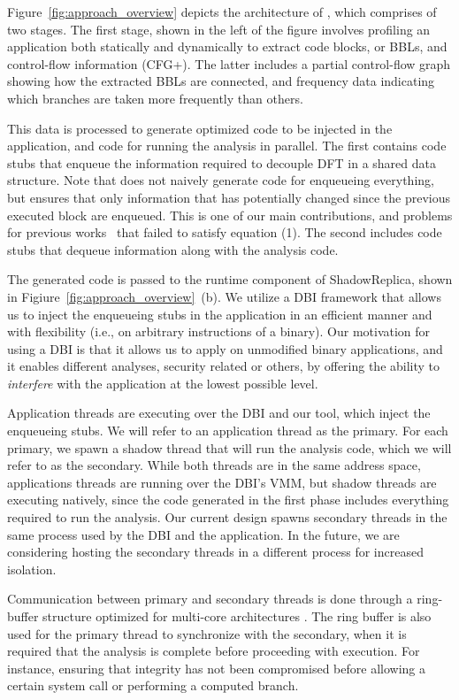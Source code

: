 Figure~\ref{fig:approach_overview} depicts the architecture of \sreplica, which
comprises of two stages. The first stage, shown in the left of the figure
involves profiling an application both statically and dynamically to extract
code blocks, or BBLs, and control-flow information (CFG+). The latter includes
a partial control-flow graph showing how the extracted BBLs are connected, and
frequency data indicating which branches are taken more frequently than others.

This data is processed to generate optimized code to be injected in the
application, and code for running the analysis in parallel. The first contains
code stubs that enqueue the information required to decouple DFT in a shared
data structure. Note that \sreplica does not naively generate code for
enqueueing everything, but ensures that only information that has potentially
changed since the previous executed block are enqueued. This is one of our main
contributions, and problems for previous works~\cite{} that failed to
satisfy equation (1). The second includes code stubs that dequeue information
along with the analysis code.

The generated code is passed to the runtime component of ShadowReplica, shown
in Figiure~\ref{fig:approach_overview}~(b). We utilize a DBI framework that
allows us to inject the enqueueing stubs in the application in an efficient
manner and with flexibility (i.e., on arbitrary instructions of a binary). Our
motivation for using a DBI is that it allows us to apply \sreplica on
unmodified binary applications, and it enables different analyses, security
related or others, by offering the ability to {\it interfere} with the application
at the lowest possible level.

Application threads are executing over the DBI and our tool, which inject the
enqueueing stubs. We will refer to an application thread as the primary. For
each primary, we spawn a shadow thread that will run the analysis code, which
we will refer to as the secondary. While both threads are in the same address
space, applications threads are running over the DBI’s VMM, but shadow threads
are executing natively, since the code generated in the first phase includes
everything required to run the analysis. Our current design spawns secondary
threads in the same process used by the DBI and the application. In the future,
we are considering hosting the secondary threads in a different process for
increased isolation.

Communication between primary and secondary threads is done through a
ring-buffer structure optimized for multi-core architectures . The ring buffer
is also used for the primary thread to synchronize with the secondary, when it
is required that the analysis is complete before proceeding with execution. For
instance, ensuring that integrity has not been compromised before allowing a
certain system call or performing a computed branch.

